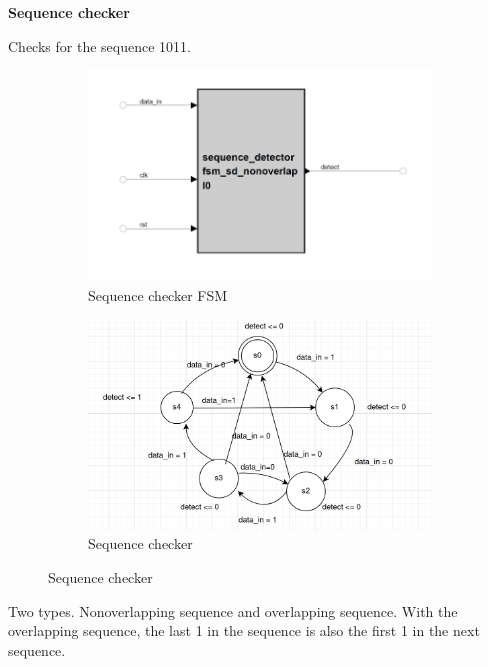 \textbf{Sequence checker}

Checks for the sequence 1011.


\begin{figure}[H]
	\centering
	\begin{subfigure}[b]{0.4\textwidth}
		\includegraphics[width=\textwidth]{images/sequence_detector.png}
		\caption{Sequence checker FSM}
	\end{subfigure}

	\begin{subfigure}[b]{0.4\textwidth}
		\includegraphics[width=\textwidth]{images/sequence_checker.png}
		\caption{Sequence checker}
	\end{subfigure}
\end{figure}


Two types. Nonoverlapping sequence and overlapping sequence.
With the overlapping sequence, the last 1 in the sequence is also the first 1 in the next sequence.

